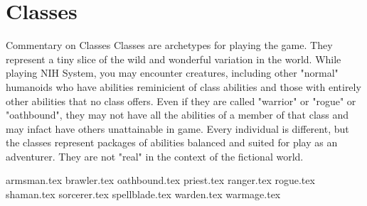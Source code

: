 \chapter{Classes}
\label{ch:classes}

\begin{DndComment}{Commentary on Classes}
Classes are archetypes for playing the game. They represent a tiny slice of the wild and wonderful variation in the world. While playing NIH System, you may encounter creatures, including other "normal" humanoids who have abilities reminicient of class abilities and those with entirely other abilities that no class offers. Even if they are called "warrior" or "rogue" or "oathbound", they may not have all the abilities of a member of that class and may infact have others unattainable in game. Every individual is different, but the classes represent packages of abilities balanced and suited for play as an adventurer. They are not "real" in the context of the fictional world.
\end{DndComment}

{armsman.tex}
{brawler.tex}
{oathbound.tex}
{priest.tex}
{ranger.tex}
{rogue.tex}
{shaman.tex}
{sorcerer.tex}
{spellblade.tex}
{warden.tex}
{warmage.tex}